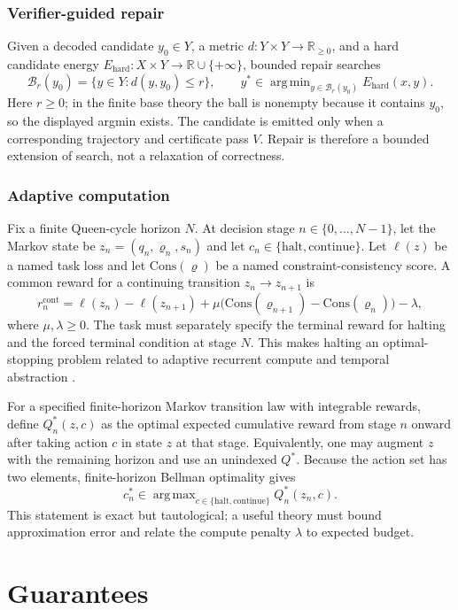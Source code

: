 \documentclass[11pt,oneside]{book}
\theoremstyle{remark}
\DeclareMathOperator*{\argmin}{arg\,min}
\DeclareMathOperator*{\argmax}{arg\,max}
\begin{document}
\section{Verifier-guided repair}

Given a decoded candidate $y_0\in Y$, a metric $d:Y\times Y\to\mathbb
R_{\ge0}$, and a hard candidate energy
$E_{\mathrm{hard}}:X\times Y\to\mathbb R\cup\{+\infty\}$, bounded repair
searches
\[
\mathcal B_r(y_0)=\{y\in Y:d(y,y_0)\le r\},
\qquad
y^*\in\argmin_{y\in\mathcal B_r(y_0)}E_{\mathrm{hard}}(x,y).
\]
Here $r\ge0$; in the finite base theory the ball is nonempty because it
contains $y_0$, so the displayed argmin exists. The candidate is emitted only
when a corresponding trajectory and certificate pass $V$. Repair is
therefore a bounded extension of search, not a relaxation of correctness.

\section{Adaptive computation}

Fix a finite Queen-cycle horizon $N$. At decision stage
$n\in\{0,\ldots,N-1\}$, let the Markov state be
$z_n=(q_n,\varrho_n,s_n)$ and let
$c_n\in\{\mathrm{halt},\mathrm{continue}\}$. Let $\ell(z)$ be a named task
loss and let $\mathrm{Cons}(\varrho)$ be a named constraint-consistency
score. A common reward for a continuing transition
$z_n\to z_{n+1}$ is
\[
r_n^{\mathrm{cont}}
=\ell(z_n)-\ell(z_{n+1})
+\mu\bigl(\mathrm{Cons}(\varrho_{n+1})
-\mathrm{Cons}(\varrho_n)\bigr)-\lambda,
\]
where $\mu,\lambda\ge0$. The task must separately specify the terminal reward
for halting and the forced terminal condition at stage $N$. This makes
halting an optimal-stopping problem related to adaptive recurrent compute and
temporal abstraction \cite{GravesACT2016,SuttonOptions1999}.

For a specified finite-horizon Markov transition law with integrable rewards,
define $Q_n^*(z,c)$ as the optimal expected cumulative reward from stage $n$
onward after taking action $c$ in state $z$ at that stage. Equivalently, one
may augment $z$ with the remaining horizon and use an unindexed $Q^*$. Because
the action set has two elements, finite-horizon Bellman optimality gives
\[
c_n^*\in
\argmax_{c\in\{\mathrm{halt},\mathrm{continue}\}}Q_n^*(z_n,c).
\]
This statement is exact but tautological; a useful theory must bound approximation error and relate the compute penalty $\lambda$ to expected budget.

\part{Guarantees}
\end{document}
